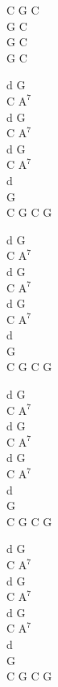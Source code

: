\begin{chord}
    C G C\\
    G C\\
    G C\\
    G C

    d G\\
    C $\mathrm{A^7}$\\
    d G\\
    C $\mathrm{A^7}$\\
    d G\\
    C $\mathrm{A^7}$\\
    d\\
    G\\
    C G C G

    d G\\
    C $\mathrm{A^7}$\\
    d G\\
    C $\mathrm{A^7}$\\
    d G\\
    C $\mathrm{A^7}$\\
    d\\
    G\\
    C G C G

    d G\\
    C $\mathrm{A^7}$\\
    d G\\
    C $\mathrm{A^7}$\\
    d G\\
    C $\mathrm{A^7}$\\
    d\\
    G\\
    C G C G

    d G\\
    C $\mathrm{A^7}$\\
    d G\\
    C $\mathrm{A^7}$\\
    d G\\
    C $\mathrm{A^7}$\\
    d\\
    G\\
    C G C G
\end{chord}
